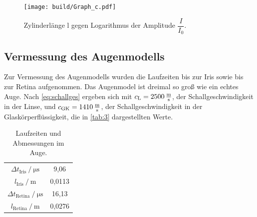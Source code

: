 \begin{figure}[H]
    \centering
    \texttt{[image: build/Graph\_c.pdf]}
    \caption{Zylinderlänge l gegen Logarithmus der Amplitude $\dfrac{I}{I_0}$.}
    \label{fig:graph2}
\end{figure}

\newpage

\subsection{Vermessung des Augenmodells}


Zur Vermessung des Augenmodells wurden die Laufzeiten bis zur Iris sowie bis zur Retina aufgenommen. Das Augenmodel ist dreimal so groß wie ein echtes Auge. 
Nach \eqref{eq:schallges} ergeben sich mit $c_\text{L} = 2500 \,\unit{\frac{\meter}{\second}}$, der Schallgeschwindigkeit in der Linse, und
$c_\text{GK} = 1410 \,\unit{\frac{\meter}{\second}}$, der Schallgeschwindigkeit in der Glaskörperflüssigkeit, die in \autoref{tab:3} dargestellten Werte.


\begin{table}
    \centering
    \caption{Laufzeiten und Abmessungen im Auge.}
    \label{tab:3} 
    \begin{tabular}{| c | c |}
    \hline 
    {$\Delta t_\text{Iris} \mathbin{/} \unit{\micro\second}$}    &       9,06   \\
    {$l_\text{Iris} \mathbin{/} \unit{\meter}$}                  &       0,0113 \\
    {$\Delta t_\text{Retina} \mathbin{/} \unit{\micro\second}$}  &      16,13   \\
    {$l_\text{Retina} \mathbin{/} \unit{\meter}$}                &       0,0276 \\
    \hline
    \end{tabular}  
\end{table}